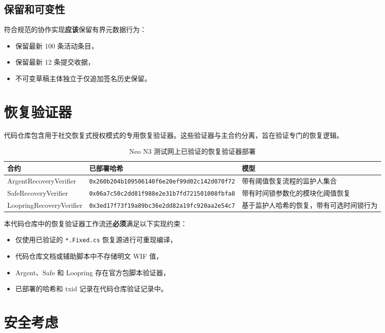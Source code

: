 \documentclass[11pt]{article}
\newcommand{\code}[1]{\texttt{#1}}
\newcommand{\must}{\textbf{必须}}
\newcommand{\should}{\textbf{应该}}
\begin{document}
\subsection{保留和可变性}
符合规范的协作实现\should{}保留有界元数据行为：
\begin{itemize}
  \item 保留最新 100 条活动条目，
  \item 保留最新 12 条提交收据，
  \item 不可变草稿主体独立于仅追加签名历史保留。
\end{itemize}

\section{恢复验证器}
代码仓库包含用于社交恢复式授权模式的专用恢复验证器。这些验证器与主合约分离，旨在验证专门的恢复逻辑。

\begin{table}[h!]
  \centering
  \caption{Neo N3 测试网上已验证的恢复验证器部署}
  \begin{tabularx}{\textwidth}{>{\raggedright\arraybackslash}p{}>{\raggedright\arraybackslash}p{}X}
    \toprule
    合约 & 已部署哈希 & 模型 \\
    \midrule
    ArgentRecoveryVerifier & \code{0x260b204b109506140f6e20ef99d02c142d070f72} & 带有阈值恢复流程的监护人集合 \\
    SafeRecoveryVerifier & \code{0x06a7c50c2dd81f988e2e31b7fd721501008fbfa8} & 带有时间锁参数化的模块化阈值恢复 \\
    LoopringRecoveryVerifier & \code{0x3ed17f73f19a89bc36e2dd82a19fc920aa2e54c7} & 基于监护人哈希的恢复，带有可选时间锁行为 \\
    \bottomrule
  \end{tabularx}
\end{table}

本代码仓库中的恢复验证器工作流还\must{}满足以下实现约束：
\begin{itemize}
  \item 仅使用已验证的 \code{*.Fixed.cs} 恢复源进行可重现编译，
  \item 代码仓库文档或辅助脚本中不存储明文 WIF 值，
  \item Argent、Safe 和 Loopring 存在官方包脚本验证器，
  \item 已部署的哈希和 txid 记录在代码仓库验证记录中。
\end{itemize}

\section{安全考虑}
\end{document}
